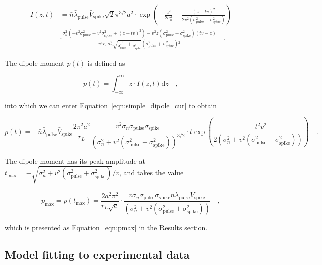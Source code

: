 \documentclass[]{elife}
\begin{document}
\begin{align}\label{eqn:simple_dipole_cur} I(z,t)&=\bar{n} \bar{\lambda
}_{\text{pulse}} \bar{V}_{\text{spike}}  \sqrt{2} \pi ^{3/2} a^2  \cdot \exp
\left(-\frac{z^2}{2 \sigma _n^2}-\frac{(z-t v)^2}{2 v^2 \left(\sigma
_{\text{pulse}}^2+\sigma _{\text{spike}}^2\right)}\right) \\ \nonumber
&\cdot\frac{ \sigma _n^2 \left(-v^2 \sigma _{\text{pulse}}^2-v^2 \sigma
_{\text{spike}}^2+(z-t v)^2\right)-v^2 z \left(\sigma _{\text{pulse}}^2+\sigma
_{\text{spike}}^2\right) (t v-z)}{v^4 r_L \sigma _n^2 \sqrt{\frac{1}{\sigma
_{\text{pulse}}^2}+\frac{1}{\sigma _{\text{spike}}^2}} \left(\sigma
_{\text{pulse}}^2+\sigma _{\text{spike}}^2\right){}^2} \quad .
\end{align}

The dipole moment \(p(t)\) is defined as

\begin{equation}
p(t) = \int_{-\infty}^{\infty}z\cdot
I(z,t)\text{d}z \quad ,
\end{equation}

into which we can enter Equation~\ref{eqn:simple_dipole_cur} to obtain

\begin{equation}
p(t) =- \bar{n} \bar{\lambda }_{\text{pulse}}
\bar{V}_{\text{spike}}\frac{2 \pi ^2 a^2}{r_L }\frac{v^2 \sigma_n
\sigma_{\text{pulse}} \sigma_{\text{spike}}}{\left(\sigma _n^2+v^2 \left(\sigma
_{\text{pulse}}^2+\sigma _{\text{spike}}^2\right)\right)^{3/2}}\cdot t
\exp\left(\frac{-t^2 v^2}{2 \left(\sigma _n^2+v^2 \left(\sigma _{\text{pulse}}^2+\sigma
_{\text{spike}}^2\right)\right)}\right) \quad .
\end{equation}

The dipole moment has its peak amplitude at
\(t_\text{max}=-\sqrt{\sigma_n^2+v^2 \left(\sigma _{\text{pulse}}^2+ \sigma _{\text{spike}}^2\right)}/v\),
and takes the value

\begin{equation}
p_\text{max} = p(t_\text{max}) = \frac{2 a^2
\pi^2}{r_L\sqrt{e}} \cdot \frac{v \sigma_n \sigma_{\text{pulse}}
\sigma_{\text{spike}} \bar{n} \bar{\lambda}_{\text{pulse}}
\bar{V}_{\text{spike}}} {\left(\sigma_n^2+v^2
\left(\sigma_{\text{pulse}}^2+\sigma_{\text{spike}}^2\right)\right)} \quad ,
\end{equation}

which is presented as Equation~\ref{eqn:pmax} in the Results section.

\subsection{Model fitting to experimental
data}\label{model-fitting-to-experimental-data}
\end{document}
